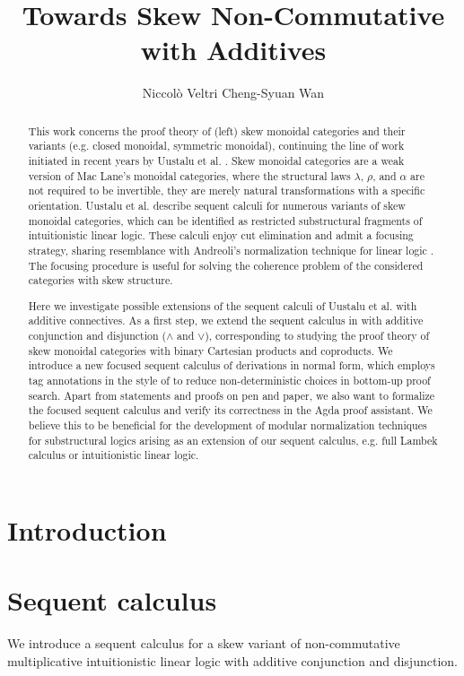\documentclass[submission,copyright,creativecommons]{eptcs}
\title{Towards Skew Non-Commutative \MILL \text{ }with Additives}
\author{
Niccol{\`o} Veltri \qquad\qquad Cheng-Syuan Wan
\institute{Tallinn University of Technology, Estonia}
\email{\quad niccolo@cs.ioc.ee \quad\qquad cswan@cs.ioc.ee}
}
\theoremstyle{definition}
\begin{document}
\maketitle
\begin{abstract}
  This work concerns the proof theory of (left) skew monoidal categories and their variants (e.g. closed monoidal, symmetric monoidal), continuing the line of work initiated in recent years by Uustalu et al. \cite{uustalu:sequent:2021, uustalu:proof:nodate,uustalu:deductive:nodate, veltri:coherence:2021,UVW:protsn}. Skew monoidal categories are a weak version of Mac Lane's monoidal categories, where the structural laws $\lambda$, $\rho$, and $\alpha$ are not required to be invertible, they are merely natural transformations with a specific orientation. Uustalu et al. describe sequent calculi for numerous variants of skew monoidal categories, which can be identified as restricted substructural fragments of intuitionistic linear logic. These calculi enjoy cut elimination and admit a focusing strategy, sharing resemblance with Andreoli's normalization technique for linear logic \cite{andreoli:logic:1992}. The focusing procedure is useful for solving the coherence problem of the considered categories with skew structure.

Here we investigate possible extensions of the sequent calculi of Uustalu et al. with additive connectives. 
As a first step, we extend the sequent calculus in \cite{uustalu:sequent:2021} with additive conjunction and disjunction ($\land$ and $\lor$), corresponding to studying the proof theory of skew monoidal categories with binary Cartesian products and coproducts. 
We introduce a new focused sequent calculus of derivations in normal form, which employs tag annotations in the style of \cite{UVW:protsn} to reduce non-deterministic choices in bottom-up proof search.
Apart from statements and proofs on pen and paper, we also want to formalize the focused sequent calculus and verify its correctness in the Agda proof assistant.
We believe this to be beneficial for the development of modular normalization techniques for substructural logics arising as an extension of our sequent calculus, e.g. full Lambek calculus or intuitionistic linear logic.

\end{abstract}


\section{Introduction}
\section{Sequent calculus}
We introduce a sequent calculus for a skew variant of non-commutative multiplicative intuitionistic linear logic with additive conjunction and disjunction.
\end{document}
